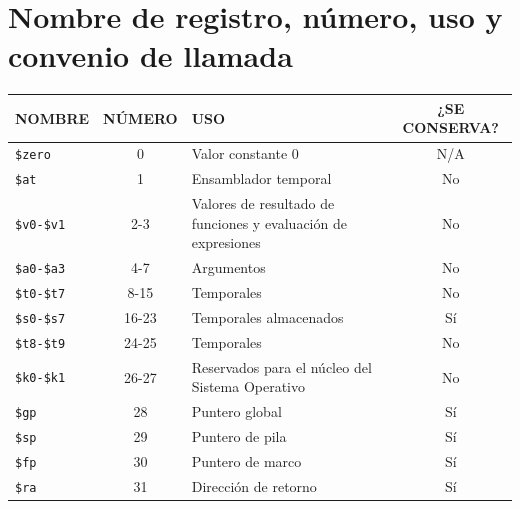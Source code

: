 \documentclass[12pt,a4paper]{article}
\begin{document}
	\section*{Nombre de registro, número, uso y convenio de llamada}
	
	\begin{table}[h!]
		\centering
		\small
		\begin{tabularx}{\textwidth}{l c X c}
			\toprule
			\textbf{NOMBRE} & \textbf{NÚMERO} & \textbf{USO} & \textbf{¿SE CONSERVA?} \\
			\midrule
			\texttt{\$zero} & 0 & Valor constante 0 & N/A \\
			\texttt{\$at} & 1 & Ensamblador temporal & No \\
			\texttt{\$v0-\$v1} & 2-3 & Valores de resultado de funciones y evaluación de expresiones & No \\
			\texttt{\$a0-\$a3} & 4-7 & Argumentos & No \\
			\texttt{\$t0-\$t7} & 8-15 & Temporales & No \\
			\texttt{\$s0-\$s7} & 16-23 & Temporales almacenados & Sí \\
			\texttt{\$t8-\$t9} & 24-25 & Temporales & No \\
			\texttt{\$k0-\$k1} & 26-27 & Reservados para el núcleo del Sistema Operativo & No \\
			\texttt{\$gp} & 28 & Puntero global & Sí \\
			\texttt{\$sp} & 29 & Puntero de pila & Sí \\
			\texttt{\$fp} & 30 & Puntero de marco & Sí \\
			\texttt{\$ra} & 31 & Dirección de retorno & Sí \\
			\bottomrule
		\end{tabularx}

	\end{table}
	
\end{document}
